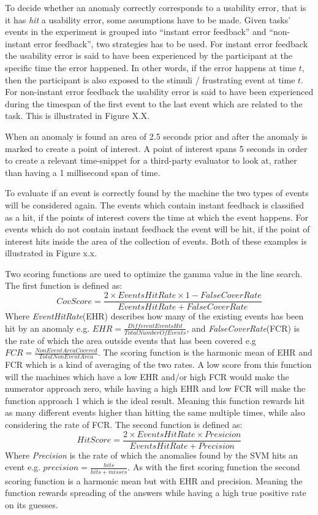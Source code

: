 To decide whether an anomaly correctly corresponds to a usability error, that is it has \textit{hit} a usability error, some assumptions have to be made. 
Given tasks' events in the experiment is grouped into ``instant error feedback'' and ``non-instant error feedback'', two strategies has to be used. 
For instant error feedback the usability error is said to have been experienced by the participant at the specific time the error happened. In other words, if the error happens at time $t$, then the participant is also exposed to the stimuli / frustrating event at time $t$.
For non-instant error feedback the usability error is said to have been experienced during the timespan of the first event to the last event which are related to the task. This is illustrated in Figure X.X. 

When an anomaly is found an area of 2.5 seconds prior and after the anomaly is marked to create a point of interest. 
A point of interest spans 5 seconds in order to create a relevant time-snippet for a third-party evaluator to look at, rather than having a 1 millisecond span of time.

To evaluate if an event is correctly found by the machine the two types of events will be considered again.
The events which contain instant feedback is classified as a hit, if the points of interest covers the time at which the event happens.
For events which do not contain instant feedback the event will be hit, if the point of interest hits inside the area of the collection of events. Both of these examples is illustrated in Figure x.x. 

Two scoring functions are used to optimize the gamma value in the line search. The first function is defined as: 
\[CovScore = \frac{2 \times EventsHitRate \times 1-FalseCoverRate}{EventsHitRate + FalseCoverRate}\]
Where \textit{EventHitRate}(EHR) describes how many of the existing events has been hit by an anomaly e.g. $EHR = \frac{DifferentEventsHit}{TotalNumberOfEvents}$, and \textit{FalseCoverRate}(FCR) is the rate of which the area outside events that has been covered e.g $FCR = \frac{NonEventAreaCovered}{TotalNonEventArea}$. 
The scoring function is the harmonic mean of EHR and FCR which is a kind of averaging of the two rates.
A low score from this function will the machines which have a low EHR and/or high FCR would make the numerator approach zero, while having a high EHR and low FCR will make the function approach 1 which is the ideal result.
Meaning this function rewards hit as many different events higher than hitting the same multiple times, while also considering the rate of FCR.
The second function is defined as: 
\[HitScore = \frac{2 \times EventsHitRate \times Presicion}{EventsHitRate + Precision}\]
Where \textit{Precision} is the rate of which the anomalies found by the SVM hits an event e.g. $precision = \frac{hits}{hits+misses}$. 
As with the first scoring function the second scoring function is a harmonic mean but with EHR and precision.
Meaning the function rewards spreading of the answers while having a high true positive rate on its guesses.


